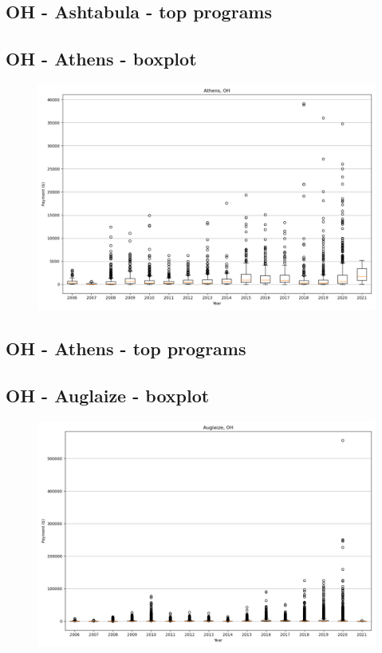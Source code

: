 \subsection*{OH - Ashtabula - top programs}

\newpage
\subsection*{OH - Athens - boxplot}
\begin{figure}[h]
\centering
\includegraphics[width=7in]{../output/boxplots/counties/Athens-OH_boxplot.png}
\end{figure}


\subsection*{OH - Athens - top programs}

\newpage
\subsection*{OH - Auglaize - boxplot}
\begin{figure}[h]
\centering
\includegraphics[width=7in]{../output/boxplots/counties/Auglaize-OH_boxplot.png}
\end{figure}


